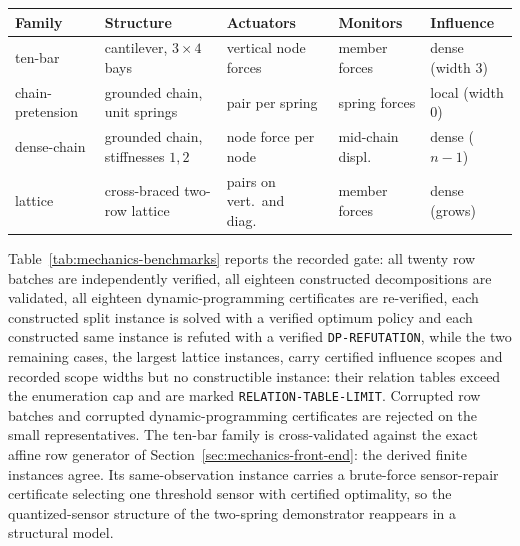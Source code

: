 \documentclass[11pt]{article}
\theoremstyle{plain}
\theoremstyle{definition}
\theoremstyle{remark}
\begin{document}
\begin{center}
\footnotesize
\begin{tabular}{@{}lllll@{}}
\toprule
Family & Structure & Actuators & Monitors & Influence\\
\midrule
ten-bar & cantilever, \(3\times4\) bays & vertical node forces & member forces & dense (width 3)\\
chain-pretension & grounded chain, unit springs & pair per spring & spring forces & local (width 0)\\
dense-chain & grounded chain, stiffnesses \(1,2\) & node force per node & mid-chain displ.\ & dense (\(n-1\))\\
lattice & cross-braced two-row lattice & pairs on vert.\ and diag.\ & member forces & dense (grows)\\
\bottomrule
\end{tabular}
\label{tab:mechanics-families}
\end{center}

Table~\ref{tab:mechanics-benchmarks} reports the recorded gate: all twenty
row batches are independently verified, all eighteen constructed
decompositions are validated, all eighteen dynamic-programming certificates
are re-verified, each constructed split instance is solved with a verified
optimum policy and each constructed same instance is refuted with a verified
\texttt{DP-REFUTATION}, while the two remaining cases, the largest lattice
instances, carry certified influence scopes and recorded scope widths but no
constructible instance: their relation tables exceed the enumeration cap and
are marked
\texttt{RELATION-TABLE-LIMIT}.  Corrupted row batches and
corrupted dynamic-programming certificates are rejected on the small
representatives.  The ten-bar family is cross-validated against the exact
affine row generator of Section~\ref{sec:mechanics-front-end}: the derived
finite instances agree.  Its same-observation instance carries a brute-force
sensor-repair certificate selecting one threshold sensor with certified
optimality, so the quantized-sensor structure of the two-spring demonstrator
reappears in a structural model.
\end{document}
